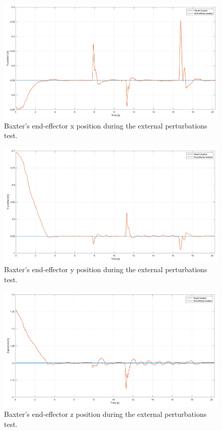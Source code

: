 \documentclass[11pt]{report} %
\begin{document}
\begin{figure}[H]
    \centering
    \includegraphics[width=1.0\linewidth]{assets/imgs/control_theory/mpc_regulation_external_perturbations/x_pose.png}
    \caption{Baxter's end-effector x position during the external perturbations test.} 
    \label{fig_baxter_x_pose_mpc_external_perturbations_experiments}
\end{figure}

\begin{figure}[H]
    \centering
    \includegraphics[width=1.0\linewidth]{assets/imgs/control_theory/mpc_regulation_external_perturbations/y_pose.png}
    \caption{Baxter's end-effector y position during the external perturbations test.} 
    \label{fig_baxter_y_pose_mpc_external_perturbations_experiments}
\end{figure}

\begin{figure}[H]
    \centering
    \includegraphics[width=1.0\linewidth]{assets/imgs/control_theory/mpc_regulation_external_perturbations/z_pose.png}
    \caption{Baxter's end-effector z position during the external perturbations test.} 
    \label{fig_baxter_z_pose_mpc_external_perturbations_experiments}
\end{figure}
\end{document}
